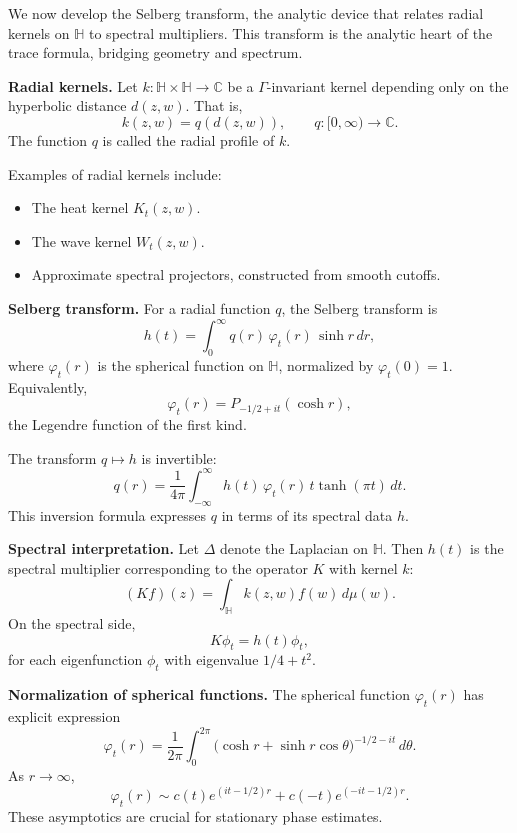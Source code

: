 
\noindent
We now develop the Selberg transform,
the analytic device that relates radial kernels on $\mathbb{H}$ to spectral multipliers.
This transform is the analytic heart of the trace formula,
bridging geometry and spectrum.

\medskip

\noindent\textbf{Radial kernels.}
Let $k:\mathbb{H}\times \mathbb{H}\to\mathbb{C}$ be a $\Gamma$-invariant kernel
depending only on the hyperbolic distance $d(z,w)$.
That is,
\[
  k(z,w) = q(d(z,w)), \qquad q:[0,\infty)\to \mathbb{C}.
\]
The function $q$ is called the radial profile of $k$.

\medskip

\noindent
Examples of radial kernels include:
\begin{itemize}
  \item The heat kernel $K_{t}(z,w)$.
  \item The wave kernel $W_{t}(z,w)$.
  \item Approximate spectral projectors, constructed from smooth cutoffs.
\end{itemize}

\medskip

\noindent\textbf{Selberg transform.}
For a radial function $q$, the Selberg transform is
\[
  h(t) = \int_{0}^{\infty} q(r)\,\varphi_{t}(r)\,\sinh r\,dr,
\]
where $\varphi_{t}(r)$ is the spherical function on $\mathbb{H}$,
normalized by $\varphi_{t}(0)=1$.
Equivalently,
\[
  \varphi_{t}(r) = P_{-1/2+it}(\cosh r),
\]
the Legendre function of the first kind.

\medskip

\noindent
The transform $q\mapsto h$ is invertible:
\[
  q(r) = \frac{1}{4\pi}\int_{-\infty}^{\infty} h(t)\,\varphi_{t}(r)\,t\tanh(\pi t)\,dt.
\]
This inversion formula expresses $q$ in terms of its spectral data $h$.

\medskip

\noindent\textbf{Spectral interpretation.}
Let $\Delta$ denote the Laplacian on $\mathbb{H}$.
Then $h(t)$ is the spectral multiplier corresponding to the operator $K$ with kernel $k$:
\[
  (Kf)(z) = \int_{\mathbb{H}} k(z,w)f(w)\,d\mu(w).
\]
On the spectral side,
\[
  K \phi_{t} = h(t)\phi_{t},
\]
for each eigenfunction $\phi_{t}$ with eigenvalue $1/4+t^{2}$.

\medskip

\noindent\textbf{Normalization of spherical functions.}
The spherical function $\varphi_{t}(r)$ has explicit expression
\[
  \varphi_{t}(r) = \frac{1}{2\pi}\int_{0}^{2\pi} \big(\cosh r + \sinh r\cos\theta\big)^{-1/2-it}\,d\theta.
\]
As $r\to\infty$,
\[
  \varphi_{t}(r) \sim c(t) e^{(it-1/2)r} + c(-t)e^{(-it-1/2)r}.
\]
These asymptotics are crucial for stationary phase estimates.


